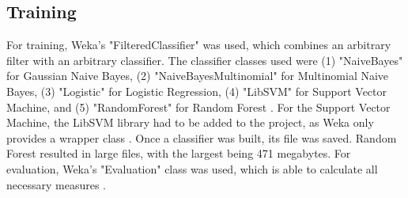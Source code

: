 \subsection{Training}
For training, Weka's "FilteredClassifier" was used, which combines an arbitrary filter with an arbitrary classifier. The classifier classes used were (1) "NaiveBayes" for Gaussian Naive Bayes, (2) "NaiveBayesMultinomial" for Multinomial Naive Bayes, (3) "Logistic" for Logistic Regression, (4) "LibSVM" for Support Vector Machine, and (5) "RandomForest" for Random Forest \cite{Weka}. For the Support Vector Machine, the LibSVM library had to be added to the project, as Weka only provides a wrapper class \cite{Chang2001}. Once a classifier was built, its file was saved. Random Forest resulted in large files, with the largest being 471 megabytes. For evaluation, Weka's "Evaluation" class was used, which is able to calculate all necessary measures \cite{Weka}.